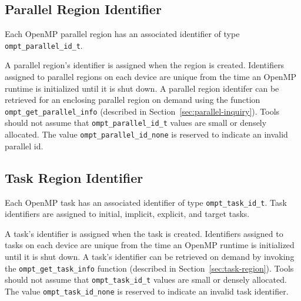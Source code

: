 \documentclass{article}
\begin{document}
\subsection{Parallel Region Identifier}
  Each OpenMP parallel region has an associated identifier of type
  \verb|ompt_parallel_id_t|. 

\noindent
  A parallel region's identifier is assigned
  when the region is created.  Identifiers assigned to parallel regions on each device are unique from the time an 
  OpenMP runtime is initialized until it is shut down. 
  A parallel region identifer can be retrieved for an enclosing parallel region
  on demand using the function \verb|ompt_get_parallel_info|  (described in Section~\ref{sec:parallel-inquiry}).
  Tools should not assume that \verb|ompt_parallel_id_t| values are small or densely allocated.
  The value \verb|ompt_parallel_id_none| is reserved to indicate an invalid parallel id.
 
 
  \subsection{Task Region Identifier}
  Each OpenMP task has an associated identifier of type
  \verb|ompt_task_id_t|. Task identifiers are assigned to
   initial, implicit, explicit, and target tasks.

  A task's identifier is assigned
  when the task is created. 
  Identifiers assigned to tasks on each device are unique from the time an 
  OpenMP runtime is initialized until it is shut down. 
  A task's identifier can be retrieved
  on demand by invoking the \verb|ompt_get_task_info|  function (described in Section~\ref{sec:task-region}).
  Tools should not assume that \verb|ompt_task_id_t| values are small or densely allocated. 
  The value \verb|ompt_task_id_none| is reserved to indicate an invalid task identifier.
  
\end{document}
